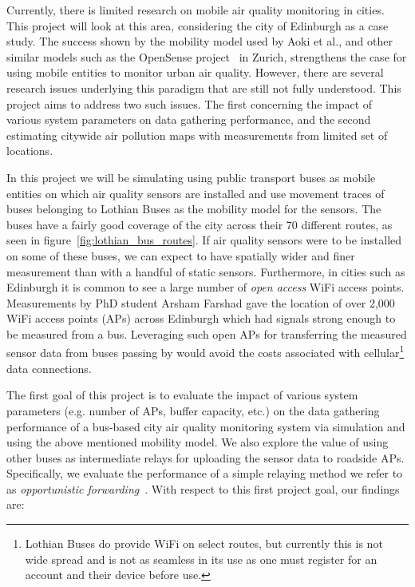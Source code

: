     Currently, there is limited research on mobile air quality monitoring in cities. This project will look at this area, considering the city of Edinburgh as a case study. The success shown by the mobility model used by Aoki et al., and other similar models such as the OpenSense project~\cite{opensensezurich} in Zurich, strengthens the case for using mobile entities to monitor urban air quality. However, there are several research issues underlying this paradigm that are still not fully understood. This project aims to address two such issues. The first concerning the impact of various system parameters on data gathering performance, and the second estimating citywide air pollution maps with measurements from limited set of locations. 

    In this project we will be simulating using public transport buses as mobile entities on which air quality sensors are installed and use movement traces of buses belonging to Lothian Buses as the mobility model for the sensors. The buses have a fairly good coverage of the city across their 70 different routes, as seen in figure~\ref{fig:lothian_bus_routes}. If air quality sensors were to be installed on some of these buses, we can expect to have spatially wider and finer measurement than with a handful of static sensors. Furthermore, in cities such as Edinburgh it is common to see a large number of \emph{open access} WiFi access points. Measurements by PhD student Arsham Farshad gave the location of over 2,000 WiFi access points (APs) across Edinburgh which had signals strong enough to be measured from a bus. Leveraging such open APs for transferring the measured sensor data from buses passing by would avoid the costs associated with cellular\footnote{Lothian Buses do provide WiFi on select routes, but currently this is not wide spread and is not as seamless in its use as one must register for an account and their device before use.} data connections. 


    The first goal of this project is to evaluate the impact of various system parameters (e.g. number of APs, buffer capacity, etc.) on the data gathering performance of a bus-based city air quality monitoring system via simulation and using the above mentioned mobility model. We also explore the value of using other buses as intermediate relays for uploading the sensor data to roadside APs. Specifically, we evaluate the performance of a simple relaying method we refer to as \emph{opportunistic forwarding}~\cite{opportunisticforwarding}. With respect to this first project goal, our findings are: 

